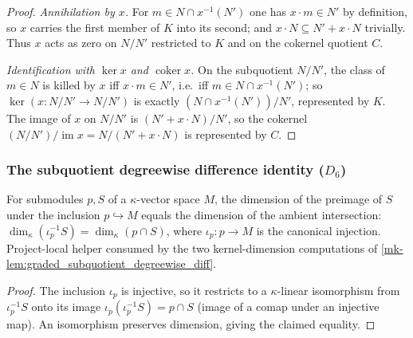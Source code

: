 \begin{proof}
  \emph{Annihilation by \(x\).} For \(m \in N \cap x^{-1}(N')\) one has
  \(x \cdot m \in N'\) by definition, so \(x\) carries the first member of \(K\) into
  its second; and \(x \cdot N \subseteq N' + x \cdot N\) trivially. Thus \(x\) acts as
  zero on \(N/N'\) restricted to \(K\) and on the cokernel quotient \(C\).

  \emph{Identification with \(\ker x\) and \(\operatorname{coker} x\).} On the
  subquotient \(N/N'\), the class of \(m \in N\) is killed by \(x\) iff
  \(x \cdot m \in N'\), i.e.\ iff \(m \in N \cap x^{-1}(N')\); so \(\ker(x : N/N' \to
  N/N')\) is exactly \((N \cap x^{-1}(N'))/N'\), represented by \(K\). The image of
  \(x\) on \(N/N'\) is \((N' + x \cdot N)/N'\), so the cokernel
  \((N/N')/\operatorname{im} x = N/(N' + x \cdot N)\) is represented by \(C\).
\end{proof}

\subsubsection*{The subquotient degreewise difference identity ($D_6$)}

\begin{lemma}\label{mk-lem:graded_finrank_comap_subtype}
  \leanok

  For submodules \(p, S\) of a \(\kappa\)-vector space \(M\), the dimension of the
  preimage of \(S\) under the inclusion \(p \hookrightarrow M\) equals the dimension of
  the ambient intersection: \(\dim_\kappa(\iota_p^{-1} S) = \dim_\kappa(p \cap S)\),
  where \(\iota_p : p \to M\) is the canonical injection. Project-local helper consumed
  by the two kernel-dimension computations of \ref{mk-lem:graded_subquotient_degreewise_diff}.
\end{lemma}
\begin{proof}
  \leanok

The inclusion \(\iota_p\) is injective, so it restricts to a \(\kappa\)-linear
  isomorphism from \(\iota_p^{-1} S\) onto its image \(\iota_p(\iota_p^{-1} S) = p \cap S\)
  (image of a comap under an injective map). An isomorphism preserves dimension, giving
  the claimed equality.
\end{proof}

